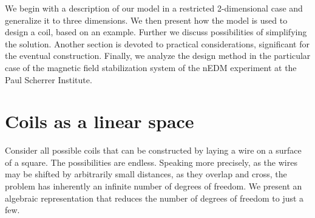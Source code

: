 




We begin with a description of our model in a restricted 2-dimensional case and generalize it to three dimensions. We then present how the model is used to design a coil, based on an example. Further we discuss possibilities of simplifying the solution. Another section is devoted to practical considerations, significant for the eventual construction. Finally, we analyze the design method in the particular case of the magnetic field stabilization system of the nEDM experiment at the Paul Scherrer Institute.


\section{Coils as a linear space}
Consider all possible coils that can be constructed by laying a wire on a surface of a square. The possibilities are endless. Speaking more precisely, as the wires may be shifted by arbitrarily small distances, as they overlap and cross, the problem has inherently an infinite number of degrees of freedom. We present an algebraic representation that reduces the number of degrees of freedom to just a few.


